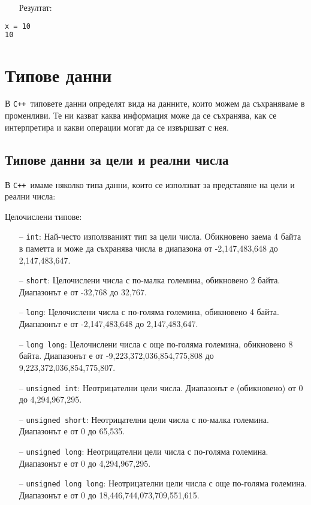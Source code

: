 \documentclass[oneside]{book}
\newcommand*{\code}[1]{\texttt{#1}}
\newcommand*{\cpp}{\texttt{C++}\ }
\begin{document}
\begin{itemize}\item[Резултат:]\end{itemize}
\begin{mdframed}\begin{lstlisting}[language=bash]
x = 10
10
\end{lstlisting}\end{mdframed}

\chapter{Типове данни}
В \cpp типовете данни определят вида на данните, които можем да съхраняваме в променливи. Те ни казват каква информация може да се съхранява, как се интерпретира и какви операции могат да се извършват с нея.
\section{Типове данни за цели и реални числа}
В \cpp имаме няколко типа данни, които се използват за представяне на цели и реални числа:

Целочислени типове:
\begin{itemize}
    \item[--] \code{int}: Най-често използваният тип за цели числа. Обикновено заема 4 байта в паметта и може да съхранява числа в диапазона от -2,147,483,648 до 2,147,483,647.
    \item[--] \code{short}: Целочислени числа с по-малка големина, обикновено 2 байта. Диапазонът е от -32,768 до 32,767.
    \item[--] \code{long}: Целочислени числа с по-голяма големина, обикновено 4 байта. Диапазонът е от -2,147,483,648 до 2,147,483,647.
    \item[--] \code{long long}: Целочислени числа с още по-голяма големина, обикновено 8 байта. Диапазонът е от -9,223,372,036,854,775,808 до 9,223,372,036,854,775,807.
    \item[--] \code{unsigned int}: Неотрицателни цели числа. Диапазонът е (обикновено) от 0 до 4,294,967,295.
    \item[--] \code{unsigned short}: Неотрицателни цели числа с по-малка големина. Диапазонът е от 0 до 65,535.
    \item[--] \code{unsigned long}: Неотрицателни цели числа с по-голяма големина. Диапазонът е от 0 до 4,294,967,295.
    \item[--] \code{unsigned long long}: Неотрицателни цели числа с още по-голяма големина. Диапазонът е от 0 до 18,446,744,073,709,551,615.
\end{itemize}
\end{document}
